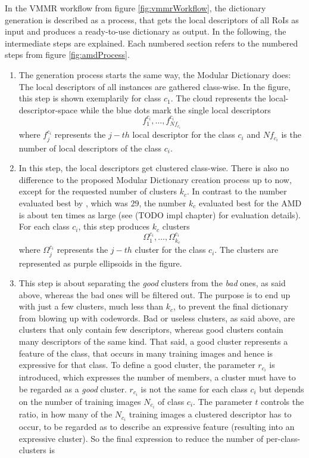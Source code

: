 In the VMMR workflow from figure \ref{fig:vmmrWorkflow}, the dictionary generation is described as a process, that gets the local descriptors of all RoIs as input and produces a ready-to-use dictionary as output. In the following, the intermediate steps are explained. Each numbered section refers to the numbered steps from figure \ref{fig:amdProcess}.
\begin{enumerate}
	\item The generation process starts the same way, the Modular Dictionary does: The local descriptors of all instances are gathered class-wise. In the figure, this step is shown exemplarily for class $c_1$. The cloud represents the local-descriptor-space while the blue dots mark the single local descriptors
	\begin{equation}\label{eq:descriptorsRoI}
	f_1^{c_i},\dots,f_{Nf_{c_i}}^{c_i}
	\end{equation}
where $f_j^{c_i}$ represents the $j-th$ local descriptor for the class $c_i$ and $Nf_{c_i}$ is the number of local descriptors of the class $c_i$.
	\item In this step, the local descriptors get clustered class-wise. There is also no difference to the proposed Modular Dictionary creation process up to now, except for the requested number of clusters $k_c$. In contrast to the number evaluated best by \citeauthor{siddiqui2015robust}, which was $29$, the number $k_c$ evaluated best for the AMD is about ten times as large (see (TODO impl chapter) for evaluation details). For each class $c_i$, this step produces $k_c$ clusters
	\begin{equation}\label{eq:clustersRoI}
	\Omega_1^{c_i},\dots,\Omega_{k_c}^{c_i}
	\end{equation}
where $\Omega_j^{c_i}$ represents the $j-th$ cluster for the class $c_i$. The clusters are represented as purple ellipsoids in the figure.
	\item This step is about separating the \emph{good} clusters from the \emph{bad} ones, as said above, whereas the bad ones will be filtered out. The purpose is to end up with just a few clusters, much less than $k_c$, to prevent the final dictionary from blowing up with codewords. Bad or useless clusters, as said above, are clusters that only contain few descriptors, whereas good clusters contain many descriptors of the same kind. That said, a good cluster represents a feature of the class, that occurs in many training images and hence is expressive for that class. To define a good cluster, the parameter $r_{c_i}$ is introduced, which expresses the number of members, a cluster must have to be regarded as a \emph{good} cluster. $r_{c_i}$ is not the same for each class $c_i$ but depends on the number of training images $N_{c_i}$ of class $c_i$. The parameter $t$ controls the ratio, in how many of the $N_{c_i}$ training images a clustered descriptor has to occur, to be regarded as to describe an expressive feature (resulting into an expressive cluster). So the final expression to reduce the number of per-class-clusters is

\end{enumerate}
